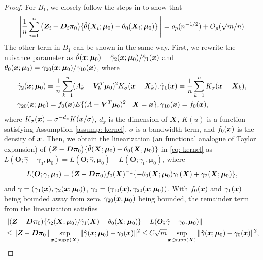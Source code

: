 \documentclass[12pt]{article}
\begin{document}
{\begin{proof}
For $ B_1 $, we  closely follow the steps in \citet[Chapter 8]{Newey1994_handbook} to  show that 
\begin{align}
\left\|	\frac1n \sum_{i=1}^n  \big( \bm{Z}_i-\bm D_i \bm\pi_0 \big)  \{\hat\theta(\bm{X}_i; \bm \mu_0 )   - \theta_0(\bm{X}_i; \bm \mu_0 ) \} \right\|= o_p(n^{-1/2} )+ O_p(\sqrt{m}/n). \label{eq: kernel}
\end{align}
The other term in $ B_1 $ can be shown in the same way.  First, we  rewrite the nuisance parameter as $ \hat\theta(\bm x; \bm \mu_0 ) =\hat \gamma_2 (\bm x; \bm \mu_0 ) /\hat\gamma_1(\bm x)  $  and $ \theta_0(\bm x; \bm \mu_0 ) = \gamma_{20} (\bm x; \bm \mu_0 ) /\gamma_{10}(\bm x)  $, where 
 \begin{align*}
 	&\hat\gamma_2(\bm x; \bm \mu_0) =\frac1n \sum_{k=1}^{n}  (A_k - \bm{V}_k^T \bm\mu_0)^2K_{\sigma} (\bm x - \bm{X}_k), 	\hat\gamma_1(\bm x ) =\frac1n \sum_{k=1}^{n} K_{\sigma} (\bm x - \bm{X}_k), \\
 	&\gamma_{20} (\bm x; \bm \mu_0 ) = f_0(\bm x) E\{ (A - \bm{V}^T \bm\mu_0)^2\mid \bm X= \bm x \}, \gamma_{10}(\bm x) = f_0(\bm x),
  \end{align*}
where $ K_\sigma (\bm x ) = \sigma^{-d_x} K(\bm x/\sigma)$, $ d_x $ is the dimension of $ \bm{X} $, $ K(u) $ is a function satisfying Assumption \ref{assump: kernel},  $ \sigma $ is a bandwidth term, and $ f_0(\bm x) $ is the density of $ \bm x $. Then, we obtain the linearization (an functional analogue of  Taylor expansion) of $  \big( \bm{Z}-\bm D \bm\pi_0 \big)  \{\hat\theta(\bm{X}; \bm \mu_0 )   - \theta_0(\bm{X},\bm \mu_0 ) \}$  in \eqref{eq: kernel} as  $ L(\bm O;\hat  \gamma- \gamma_0, \bm \mu_0) = L(\bm O;\hat  \gamma, \bm \mu_0) - L(\bm O; \gamma_0, \bm \mu_0) $,  where
\begin{align*}
 L(\bm O; \gamma, \bm \mu_0)  = (\bm Z - \bm D\bm\pi_0 ) f_0(\bm{X})^{-1} \{-  \theta_0(\bm{X}; \bm \mu_0) \gamma_1(\bm{X}) + \gamma_2(\bm{X}; \bm \mu_0) \},
\end{align*}
and  $ \gamma =( \gamma_1(\bm x), \gamma_2(\bm x; \bm\mu_0) )$, $ \gamma_0 =( \gamma_{10}(\bm x), \gamma_{20}(\bm x; \bm\mu_0) )$.  With $ f_0(\bm x)$ and $ \gamma_1(\bm x) $ being bounded away from zero, $ \gamma_{20} (\bm x; \bm \mu_0) $ being bounded,  the remainder term from the linearization  satisfies
\begin{align}
	&\left\| (\bmZ - \bm D \bm \pi_0) \{\hat \gamma_2(\bmX; \bm \mu_0)/ \hat \gamma_1(\bmX) - \theta_0(\bmX; \bm \mu_0)\}-   L(\bm O; \hat \gamma- \gamma_0 , \bm \mu_0)  \right\| \nonumber\\
	&\leq \| \bmZ - \bm D \bm\pi_0 \| \sup_{\bmx\in \text{supp} (\bmX)} \|\hat \gamma(\bmx; \bm \mu_0)- \gamma_0 (\bm x)\|^2 \leq C \sqrt{m} \sup_{\bmx\in \text{supp} (\bmX)} \|\hat \gamma(\bmx; \bm \mu_0)- \gamma_0 (\bm x)\|^2 , \nonumber

\end{align}
\end{proof}}
\end{document}
